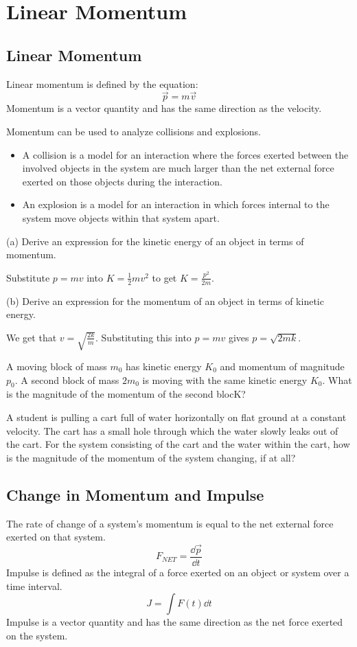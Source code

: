 \documentclass[../mech.tex]{subfiles}
\begin{document}
\chapter{Linear Momentum}
\section{Linear Momentum}
Linear momentum is defined by the equation:
\[ \vec{p}=m\vec{v} \]
Momentum is a vector quantity and has the same direction as the velocity.

Momentum can be used to analyze collisions and explosions.
\begin{itemize}
    \item A collision is a model for an interaction where the forces exerted between the involved objects in the system are much larger than the net external force exerted on those objects during the interaction.
    \item An explosion is a model for an interaction in which forces internal to the system move objects within that system apart.
\end{itemize}

\begin{example}
    (a) Derive an expression for the kinetic energy of an object in terms of momentum.

    Substitute $p=mv$ into $K=\frac{1}{2}mv^2$ to get $K=\frac{p^2}{2m}$.

    (b) Derive an expression for the momentum of an object in terms of kinetic energy.

    We get that $v=\sqrt{\frac{2k}{m}}$. Substituting this into $p=mv$ gives $p=\sqrt{2mk}$.
\end{example}

\ex A moving block of mass $m_0$ has kinetic energy $K_0$ and momentum of magnitude $p_0$. A second block of mass $2m_0$ is moving with the same kinetic energy $K_0$. What is the magnitude of the momentum of the second blocK?

\ex A student is pulling a cart full of water horizontally on flat ground at a constant velocity. The cart has a small hole through which the water slowly leaks out of the cart. For the system consisting of the cart and the water within the cart, how is the magnitude of the momentum of the system changing, if at all?

\section{Change in Momentum and Impulse}
The rate of change of a system's momentum is equal to the net external force exerted on that system.
\[ F_{NET}=\frac{\dd \vec{p}}{\dd t} \]
Impulse is defined as the integral of a force exerted on an object or system over a time interval.
\[ J = \int F(t)\dd t \]
Impulse is a vector quantity and has the same direction as the net force exerted on the system.
\end{document}
